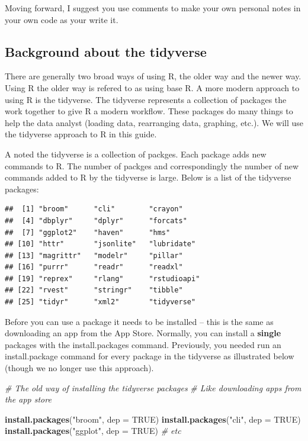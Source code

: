 \documentclass[
]{krantz}
\makeatletter
\newenvironment{Shaded}{\begin{snugshade}}{\end{snugshade}}
\newcommand{\CommentTok}[1]{\textcolor[rgb]{0.37,0.37,0.37}{\textit{#1}}}
\newcommand{\DataTypeTok}[1]{\textcolor[rgb]{0.27,0.27,0.27}{#1}}
\newcommand{\KeywordTok}[1]{\textcolor[rgb]{0.27,0.27,0.27}{\textbf{#1}}}
\newcommand{\NormalTok}[1]{#1}
\newcommand{\OtherTok}[1]{\textcolor[rgb]{0.37,0.37,0.37}{#1}}
\newcommand{\StringTok}[1]{\textcolor[rgb]{0.5,0.5,0.5}{#1}}
\newenvironment{kframe}{%
\medskip{}
\setlength{\fboxsep}{.8em}
 \def\at@end@of@kframe{}%
 \ifinner\ifhmode%
  \def\at@end@of@kframe{\end{minipage}}%
  \begin{minipage}{\columnwidth}%
 \fi\fi%
 \def\FrameCommand##1{\hskip\@totalleftmargin \hskip-\fboxsep
 \colorbox{shadecolor}{##1}\hskip-\fboxsep
     \hskip-\linewidth \hskip-\@totalleftmargin \hskip\columnwidth}%
 \MakeFramed {\advance\hsize-\width
   \@totalleftmargin\z@ \linewidth\hsize
   \@setminipage}}%
 {\par\unskip\endMakeFramed%
 \at@end@of@kframe}
\renewenvironment{Shaded}{\begin{kframe}}{\end{kframe}}
\makeatother
\begin{document}
Moving forward, I suggest you use comments to make your own personal notes in your own code as your write it.

\hypertarget{background-about-the-tidyverse}{%
\subsection{Background about the tidyverse}\label{background-about-the-tidyverse}}

There are generally two broad ways of using R, the older way and the newer way. Using R the older way is refered to as using base R. A more modern approach to using R is the tidyverse. The tidyverse represents a collection of packages the work together to give R a modern workflow. These packages do many things to help the data analyst (loading data, rearranging data, graphing, etc.). We will use the tidyverse approach to R in this guide.

A noted the tidyverse is a collection of packges. Each package adds new commands to R. The number of packges and correspondingly the number of new commands added to R by the tidyverse is large. Below is a list of the tidyverse packages:

\begin{verbatim}
##  [1] "broom"      "cli"        "crayon"    
##  [4] "dbplyr"     "dplyr"      "forcats"   
##  [7] "ggplot2"    "haven"      "hms"       
## [10] "httr"       "jsonlite"   "lubridate" 
## [13] "magrittr"   "modelr"     "pillar"    
## [16] "purrr"      "readr"      "readxl"    
## [19] "reprex"     "rlang"      "rstudioapi"
## [22] "rvest"      "stringr"    "tibble"    
## [25] "tidyr"      "xml2"       "tidyverse"
\end{verbatim}

Before you can use a package it needs to be installed -- this is the same as downloading an app from the App Store. Normally, you can install a \textbf{single} packages with the install.packages command. Previously, you needed run an install.package command for every package in the tidyverse as illustrated below (though we no longer use this approach).

\begin{Shaded}
\begin{Highlighting}[]
\CommentTok{# The old way of installing the tidyverse packages}
\CommentTok{# Like downloading apps from the app store}

\KeywordTok{install.packages}\NormalTok{(}\StringTok{"broom"}\NormalTok{, }\DataTypeTok{dep =} \OtherTok{TRUE}\NormalTok{)}
\KeywordTok{install.packages}\NormalTok{(}\StringTok{"cli"}\NormalTok{, }\DataTypeTok{dep =} \OtherTok{TRUE}\NormalTok{)}
\KeywordTok{install.packages}\NormalTok{(}\StringTok{"ggplot"}\NormalTok{, }\DataTypeTok{dep =} \OtherTok{TRUE}\NormalTok{)}
\CommentTok{# etc}
\end{Highlighting}
\end{Shaded}
\end{document}
